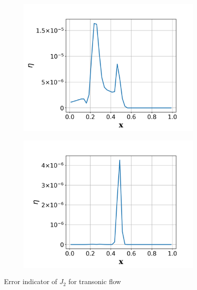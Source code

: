 \documentclass[a4paper]{article}
\begin{document}
\begin{figure}[!htbp]
  \centering
  \centering
  \begin{subfigure}{0.45\textwidth}
    \centering
    \includegraphics[width=1.0\linewidth]{figures/transonic_elem_J2error_indicator_p1.png}
    \label{fig:transonic_J2_eta_p1}
  \end{subfigure}
  \begin{subfigure}{0.45\textwidth}
    \centering
    \includegraphics[width=1.0\linewidth]{figures/transonic_elem_J2error_indicator_p2.png}
    \label{fig:transonic_J2_eta_p2}
  \end{subfigure}
  \caption{Error indicator of $J_2$ for transonic flow}
  \label{fig:tran_elem_J2_error}
\end{figure}



%
\end{document}
